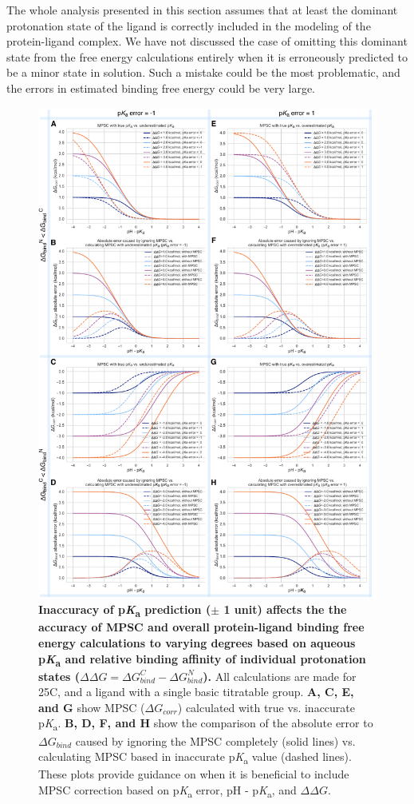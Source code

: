 \documentclass[9pt,lineno,final]{elife}
\newcommand{\pKa}{p\textit{K}\textsubscript{a}}
\begin{document}
The whole analysis presented in this section assumes that at least the dominant protonation state of the ligand is correctly included in the modeling of the protein-ligand complex. 
We have not discussed the case of omitting this dominant state from the free energy calculations entirely when it is erroneously predicted to be a minor state in solution. 
Such a mistake could be the most problematic, and the errors in estimated binding free energy could be very large.

\begin{figure}
\centering
\includegraphics[width=0.8\linewidth]{figures/pKa-inaccuracy-and-MPSC.pdf}
\caption{ {\bf Inaccuracy of \pKa{} prediction ($\pm$ 1 unit) affects the the accuracy of MPSC and overall protein-ligand binding free energy calculations to varying degrees based on aqueous \pKa{} and relative binding affinity of individual protonation states ($\Delta\Delta G = \Delta G_{bind}^{C} - \Delta G_{bind}^{N}$).} 
All calculations are made for 25\degree C, and a ligand with a single basic titratable group. {\bf A, C, E, and G} show MPSC ($\Delta G_{corr}$) calculated with true vs. inaccurate \pKa{}. 
{\bf B, D, F, and H} show the comparison of the absolute error to $\Delta G_{bind}$ caused by ignoring the MPSC completely (solid lines) vs. calculating MPSC based in inaccurate \pKa{} value (dashed lines). 
These plots provide guidance on when it is beneficial to include MPSC correction based on \pKa{} error, pH - \pKa{}, and $\Delta\Delta G$. 
}
\label{fig:pKa-inaccuracy-and-MPSC}
\end{figure}
\end{document}
